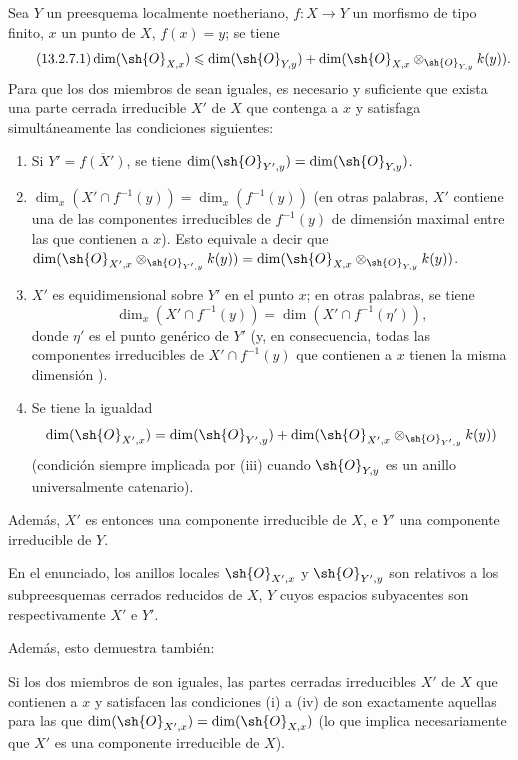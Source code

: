 \begin{proposition}[13.2.7]
\label{IV.13.2.7}
Sea $Y$ un preesquema localmente noetheriano, $f:X\to Y$ un morfismo de tipo finito, $x$ un punto de $X$, $f(x)=y$; se tiene
\[
\tag{13.2.7.1}
\label{IV.13.2.7.1}
  \dim(\sh{O}_{X,x})\leq\dim(\sh{O}_{Y,y})+\dim(\sh{O}_{X,x}\otimes_{\sh{O}_{Y,y}}k(y)).
\]
Para que los dos miembros de  sean iguales, es necesario y suficiente que exista una parte cerrada irreducible $X'$ de $X$ que contenga a $x$ y satisfaga simultáneamente las condiciones siguientes:
\begin{enumerate}[label=\textup{(\roman*)}]
  \item Si $Y'=\overline{f(X')}$, se tiene $\dim(\sh{O}_{Y',y})=\dim(\sh{O}_{Y,y})$.
  \item $\dim_x(X'\cap f^{-1}(y))=\dim_x(f^{-1}(y))$ (en otras palabras, $X'$ contiene una de las componentes irreducibles de $f^{-1}(y)$ de dimensión maximal entre las que contienen a $x$). Esto equivale a decir que $\dim(\sh{O}_{X',x}\otimes_{\sh{O}_{Y',y}}k(y))=\dim(\sh{O}_{X,x}\otimes_{\sh{O}_{Y,y}}k(y))$.
  \item $X'$ es equidimensional sobre $Y'$ en el punto $x$; en otras palabras, se tiene
  \[
    \dim_x(X'\cap f^{-1}(y))=\dim(X'\cap f^{-1}(\eta')),
  \]
  donde $\eta'$ es el punto genérico de $Y'$ (y, en consecuencia, todas las componentes irreducibles de $X'\cap f^{-1}(y)$ que contienen a $x$ tienen la misma dimensión ).
  \item Se tiene la igualdad
  \[
    \dim(\sh{O}_{X',x})=\dim(\sh{O}_{Y',y})+\dim(\sh{O}_{X',x}\otimes_{\sh{O}_{Y',y}}k(y))
  \]
  (condición siempre implicada por (iii) cuando $\sh{O}_{Y,y}$ es un anillo universalmente catenario).
\end{enumerate}
Además, $X'$ es entonces una componente irreducible de $X$, e $Y'$ una componente irreducible de $Y$.
\end{proposition}

En el enunciado, los anillos locales $\sh{O}_{X',x}$ y $\sh{O}_{Y',y}$ son relativos a los subpreesquemas cerrados reducidos de $X$, $Y$ cuyos espacios subyacentes son respectivamente $X'$ e $Y'$.

Además, esto demuestra también:

\begin{corollary}[13.2.8]
\label{IV.13.2.8}
Si los dos miembros de  son iguales, las partes cerradas irreducibles $X'$ de $X$ que contienen a $x$ y satisfacen las condiciones (i) a (iv) de  son exactamente aquellas para las que $\dim(\sh{O}_{X',x})=\dim(\sh{O}_{X,x})$ (lo que implica necesariamente que $X'$ es una componente irreducible de $X$).
\end{corollary}

